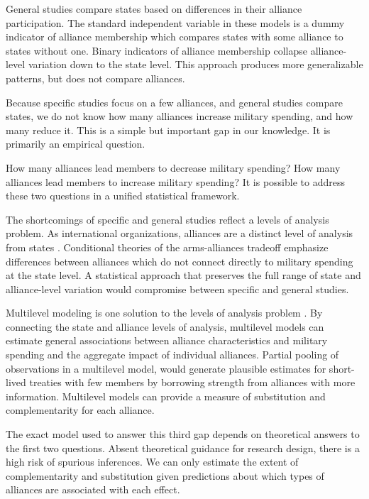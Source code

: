 \documentclass[12pt]{article}
\begin{document}
General studies compare states based on differences in their alliance participation. 
The standard independent variable in these models is a dummy indicator of alliance membership which compares states with some alliance to states without one. 
Binary indicators of alliance membership collapse alliance-level variation down to the state level. 
This approach produces more generalizable patterns, but does not compare alliances.  


Because specific studies focus on a few alliances, and general studies compare states, we do not know how many alliances increase military spending, and how many reduce it.
This is a simple but important gap in our knowledge. 
It is primarily an empirical question. 


How many alliances lead members to decrease military spending? 
How many alliances lead members to increase military spending? 
It is possible to address these two questions in a unified statistical framework. 


The shortcomings of specific and general studies reflect a levels of analysis problem. 
As international organizations, alliances are a distinct level of analysis from states \citep{Mattes2012}. 
Conditional theories of the arms-alliances tradeoff emphasize differences between alliances which do not connect directly to military spending at the state level. 
A statistical approach that preserves the full range of state and alliance-level variation would compromise between specific and general studies. 


Multilevel modeling is one solution to the levels of analysis problem \citep{GelmanHill2007, McElreath2016}. 
By connecting the state and alliance levels of analysis, multilevel models can estimate general associations between alliance characteristics and military spending and the aggregate impact of individual alliances.
Partial pooling of observations in a multilevel model, would generate plausible estimates for short-lived treaties with few members by borrowing strength from alliances with more information. 
Multilevel models can provide a measure of substitution and complementarity for each alliance. 


The exact model used to answer this third gap depends on theoretical answers to the first two questions. 
Absent theoretical guidance for research design, there is a high risk of spurious inferences. 
We can only estimate the extent of complementarity and substitution given predictions about which types of alliances are associated with each effect. 
\end{document}
